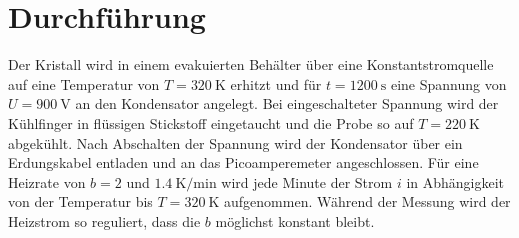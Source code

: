 \section{Durchführung}
\label{sec:Durchführung}

Der Kristall wird in einem evakuierten Behälter über eine Konstantstromquelle auf eine Temperatur von $T=\SI{320}{\kelvin}$ erhitzt und für $t=\SI{1200}{\second}$ eine Spannung von $U=\SI{900}{\volt}$ an den Kondensator angelegt.
Bei eingeschalteter Spannung wird der Kühlfinger in flüssigen Stickstoff eingetaucht und die Probe so auf $T=\SI{220}{\kelvin}$ abgekühlt.
Nach Abschalten der Spannung wird der Kondensator über ein Erdungskabel entladen und an das Picoamperemeter angeschlossen.
Für eine Heizrate von $b=2$ und $\SI{1,4}{\kelvin\per\minute}$ wird jede Minute der Strom $i$ in Abhängigkeit von der Temperatur bis $T=\SI{320}{\kelvin}$ aufgenommen.
Während der Messung wird der Heizstrom so reguliert, dass die $b$ möglichst konstant bleibt.
